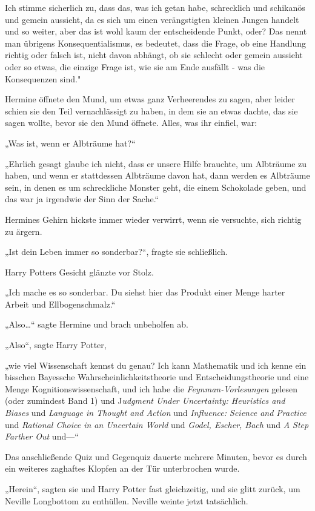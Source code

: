 {Ich stimme sicherlich zu, dass das, was ich getan habe, schrecklich und schikanös und gemein aussieht, da es sich um einen verängstigten kleinen Jungen handelt und so weiter, aber das ist wohl kaum der entscheidende Punkt, oder? Das nennt man übrigens Konsequentialismus, es bedeutet, dass die Frage, ob eine Handlung richtig oder falsch ist, nicht davon abhängt, ob sie schlecht oder gemein aussieht oder so etwas, die einzige Frage ist, wie sie am Ende ausfällt - was die Konsequenzen sind."

Hermine öffnete den Mund, um etwas ganz Verheerendes zu sagen, aber leider schien sie den Teil vernachlässigt zu haben, in dem sie an etwas dachte, das sie sagen wollte, bevor sie den Mund öffnete. Alles, was ihr einfiel, war:

„Was ist, wenn er Albträume hat?“

„Ehrlich gesagt glaube ich nicht, dass er unsere Hilfe brauchte, um Albträume zu haben, und wenn er stattdessen Albträume davon hat, dann werden es Albträume sein, in denen es um schreckliche Monster geht, die einem Schokolade geben, und das war ja irgendwie der Sinn der Sache.“

Hermines Gehirn hickste immer wieder verwirrt, wenn sie versuchte, sich richtig zu ärgern.

„Ist dein Leben immer so sonderbar?“, fragte sie schließlich.

Harry Potters Gesicht glänzte vor Stolz.

„Ich mache es so sonderbar. Du siehst hier das Produkt einer Menge harter Arbeit und Ellbogenschmalz.“

„Also…“ sagte Hermine und brach unbeholfen ab.

„Also“, sagte Harry Potter,

„wie viel Wissenschaft kennst du genau? Ich kann Mathematik und ich kenne ein bisschen Bayessche Wahrscheinlichkeitstheorie und Entscheidungstheorie und eine Menge Kognitionswissenschaft, und ich habe die \emph{Feynman-Vorlesungen} gelesen (oder zumindest Band 1) und J\emph{udgment Under Uncertainty: Heuristics and Biases} und \emph{Language in Thought and Action} und \emph{Influence: Science and Practice} und \emph{Rational Choice in an Uncertain World} und \emph{Godel, Escher, Bach} und \emph{A Step Farther Out} und—“

Das anschließende Quiz und Gegenquiz dauerte mehrere Minuten, bevor es durch ein weiteres zaghaftes Klopfen an der Tür unterbrochen wurde.

„Herein“, sagten sie und Harry Potter fast gleichzeitig, und sie glitt zurück, um Neville Longbottom zu enthüllen. Neville weinte jetzt tatsächlich.

}
